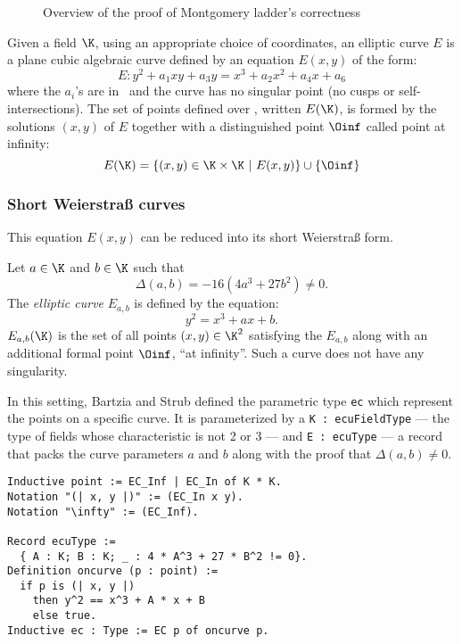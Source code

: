 \begin{figure}[h]
  \centering
  
  \caption{Overview of the proof of Montgomery ladder's correctness}
  \label{tikz:ProofHighLevel1}
\end{figure}


\begin{dfn}
  Given a field $\K$,
  using an appropriate choice of coordinates,
  an elliptic curve $E$
  is a plane cubic algebraic curve defined by an equation $E(x,y)$ of the form:
  $$E : y^2 + a_1 xy + a_3 y = x^3 + a_2 x^2 + a_4 x + a_6$$
  where the $a_i$'s are in \K\ and the curve has no singular point (\ie no cusps
  or self-intersections). The set of points defined over \K, written $E(\K)$, is formed by the
  solutions $(x,y)$ of $E$ together with a distinguished point $\Oinf$ called point at infinity:
  $$E(\K) = \{ (x,y) \in \K \times \K ~|~E(x,y)\} \cup \{\Oinf\}$$
\end{dfn}

\subsubsection{Short Weierstra{\ss} curves}
\label{subsec:ECC-Weierstrass}

This equation $E(x,y)$ can be reduced into its short Weierstra{\ss} form.

\begin{dfn}
  Let $a \in \K$ and $b \in \K$ such that $$\Delta(a,b) = -16(4a^3 + 27b^2) \neq 0.$$
  The \textit{elliptic curve} $E_{a,b}$ is defined by the equation:
  $$y^2 = x^3 + ax + b.$$
  $E_{a,b}(\K)$ is the set of all points $(x,y) \in \K^2$ satisfying the $E_{a,b}$
  along with an additional formal point $\Oinf$, ``at infinity''. Such a curve does not have any singularity.
\end{dfn}

In this setting, Bartzia and Strub defined the parametric type \texttt{ec} which
represent the points on a specific curve. It is parameterized by
a \texttt{K : ecuFieldType} --- the type of fields whose characteristic is not 2 or 3 ---
and \texttt{E : ecuType} --- a record that packs the curve parameters $a$ and $b$
along with the proof that $\Delta(a,b) \neq 0$.
\begin{lstlisting}[language=Coq]
Inductive point := EC_Inf | EC_In of K * K.
Notation "(| x, y |)" := (EC_In x y).
Notation "\infty" := (EC_Inf).

Record ecuType :=
  { A : K; B : K; _ : 4 * A^3 + 27 * B^2 != 0}.
Definition oncurve (p : point) :=
  if p is (| x, y |)
    then y^2 == x^3 + A * x + B
    else true.
Inductive ec : Type := EC p of oncurve p.
\end{lstlisting}

